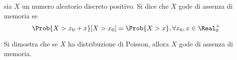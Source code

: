 \documentclass{subfiles}
\begin{document}
\begin{Definition*}
    sia $X$ un numero aleatorio discreto positivo. Si dice che $X$ gode di assenza di memoria se
    $$
        \Prob{X > x_{0} + x}[X > x_{0}] = \Prob{X > x}, \forall x_{0}, x \in \Real_{0}^{+}
    $$
\end{Definition*}
\begin{Remark*}
    Si dimostra che se $X$ ha distribuzione di Poisson, allora $X$ gode di assenza di memoria.
\end{Remark*}
\end{document}
